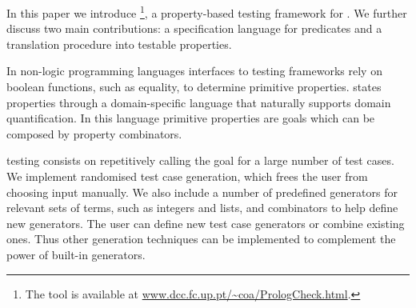 In this paper we introduce \plqc{}\footnote{The \plqc{} tool is available at \url{www.dcc.fc.up.pt/~coa/PrologCheck.html}.},
a property-based testing framework for \Prolog{}.
%
We further discuss two main contributions: a specification language for \Prolog{} predicates
and a translation procedure into testable properties.





%
In non-logic programming languages interfaces to testing frameworks rely
on boolean functions, such as equality, to determine primitive properties. %
%
%
\plqc{} states properties through a domain-specific language that
naturally supports domain quantification.
%
In this language primitive properties are %
\Prolog{} goals which can be composed by \plqc{}
property combinators.



%
%
\plqc{} testing consists on repetitively calling the goal for a large number of
test cases.
%
%
%
We implement randomised test case generation, which frees the user
from choosing input manually.
%
We also include a number of predefined generators for relevant sets of
terms, such as integers and lists, and combinators to help define new
generators.
%
The user can define new test case generators or combine
existing ones.
%
Thus other generation techniques
\cite{naylor2007logic,runciman2008smallcheck,Duregard-2012-feat} can be
implemented  to complement the power of built-in generators.
%

